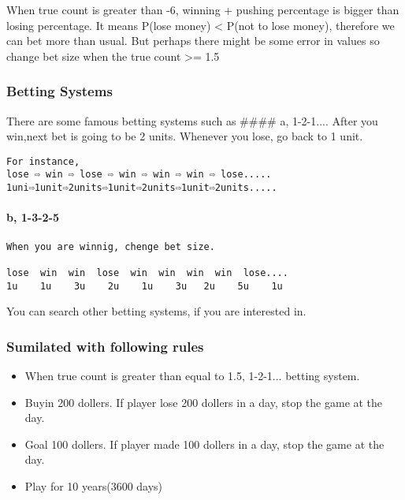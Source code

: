 \documentclass[11pt]{article}
\providecommand{\tightlist}{%
      \setlength{\itemsep}{0pt}\setlength{\parskip}{0pt}}
\begin{document}
    When true count is greater than -6, winning + pushing percentage is
bigger than losing percentage. It means P(lose money) \textless{} P(not
to lose money), therefore we can bet more than usual. But perhaps there
might be some error in values so change bet size when the true count
\textgreater{}= 1.5

    \subsubsection{Betting Systems}\label{betting-systems}

There are some famous betting systems such as \#\#\#\# a, 1-2-1....
After you win,next bet is going to be 2 units. Whenever you lose, go
back to 1 unit.

\begin{verbatim}
For instance,
lose ⇨ win ⇨ lose ⇨ win ⇨ win ⇨ win ⇨ lose.....
1uni⇨1unit⇨2units⇨1unit⇨2units⇨1unit⇨2units.....
\end{verbatim}

\paragraph{\texorpdfstring{b, 1-3-2-5}{b, 1-3-2-5 }}\label{b-1-3-2-5}

\begin{verbatim}
When you are winnig, chenge bet size.

lose  win  win  lose  win  win  win  win  lose....
1u    1u    3u    2u    1u    3u   2u    5u    1u
\end{verbatim}

You can search other betting systems, if you are interested in.

    \subsubsection{Sumilated with following
rules}\label{sumilated-with-following-rules}

\begin{itemize}
\tightlist
\item
  When true count is greater than equal to 1.5, 1-2-1... betting system.
\item
  Buyin 200 dollers. If player lose 200 dollers in a day, stop the game
  at the day.
\item
  Goal 100 dollers. If player made 100 dollers in a day, stop the game
  at the day.
\item
  Play for 10 years(3600 days)
\end{itemize}
\end{document}
